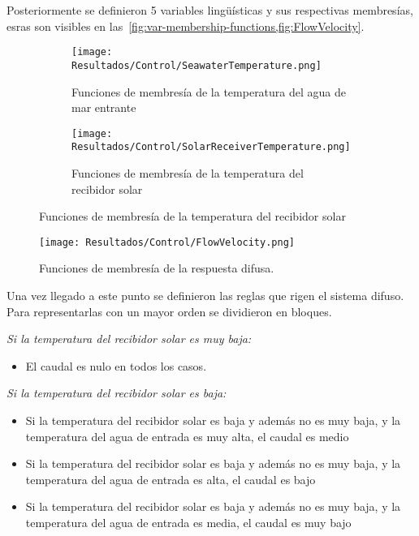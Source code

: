 			Posteriormente se definieron 5 variables lingüísticas y sus respectivas membresías, esras son visibles en las~\cref{fig:var-membership-functions,fig:FlowVelocity}.
			
			\begin{figure}[H]
				\centering
				\begin{subfigure}[t]{0.45\linewidth}
					\centering
					\texttt{[image: Resultados/Control/SeawaterTemperature.png]}
					\caption{Funciones de membresía de la temperatura del agua de mar entrante}
					\label{fig:SeawaterTemperature}
				\end{subfigure}
				\hfill
				\begin{subfigure}[t]{0.45\linewidth}
					\centering
					\texttt{[image: Resultados/Control/SolarReceiverTemperature.png]}
					\caption{Funciones de membresía de la temperatura del recibidor solar}
					\label{fig:SolarReceiverTemperature}
				\end{subfigure}
			\end{figure}
			
			\begin{figure}[H]
				\centering
				\texttt{[image: Resultados/Control/FlowVelocity.png]}
				\caption{Funciones de membresía de la respuesta difusa.}
				\label{fig:FlowVelocity}
			\end{figure}
			
			Una vez llegado a este punto se definieron las reglas que rigen el sistema difuso. Para representarlas con un mayor orden se dividieron en bloques.
			
			\textit{Si la temperatura del recibidor solar es muy baja:}\par
			
			\begin{itemize}
				\item El caudal es nulo en todos los casos.
			\end{itemize}
			
			\textit{Si la temperatura del recibidor solar es baja:}\par
			\begin{itemize}
				\item Si la temperatura del recibidor solar es baja y además no es muy baja, y la temperatura del agua de entrada es muy alta, el caudal es medio
				\item Si la temperatura del recibidor solar es baja y además no es muy baja, y la temperatura del agua de entrada es alta, el caudal es bajo
				\item Si la temperatura del recibidor solar es baja y además no es muy baja, y la temperatura del agua de entrada es media, el caudal es muy bajo
			\end{itemize}
			

